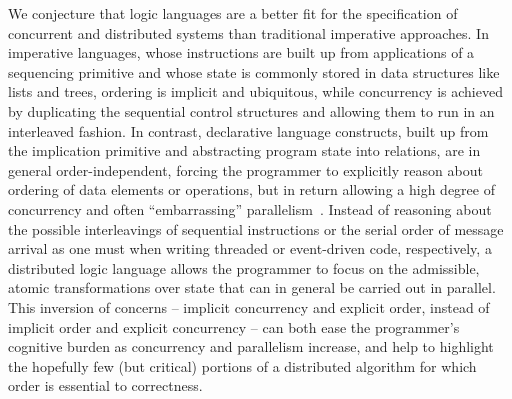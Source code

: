 \begin{comment}
Consider a distributed system in which participants announce their presence with 
\emph{heartbeat} messages; participants that want to reason about who is present must
remember the message content and the time of its arrival.  It is natural to represent the messages 
themselves as events, and the log of messages and timestamps as a persistent table:

\begin{Dedalus}
heartbeat\_cache(@Host, Peer, Time) \(\leftarrow\) 
  heartbeat(@Host, Peer), local\_time(Time);
\end{Dedalus}

 Although the Overlog language permits the transparent
intermixing of the table types, their interaction is often unintuitive, and compromises the
reading of rules as logical implications.  The state of the system after the arrival of some
number of \emph{heartbeat} events is clearly not a minimal model of the given input database,
which does not contain the events that (for one moment) caused the derivation of 
\emph{heartbeat\_cache} tuples.



\end{comment}

We conjecture that logic languages are a better fit for the specification of concurrent and distributed systems than traditional imperative approaches.  In imperative languages, whose instructions are built up from applications of a sequencing primitive and whose state is commonly stored in data structures like lists and trees, ordering is implicit and ubiquitous, 
while concurrency is achieved by duplicating the sequential control structures and allowing them
to run in an interleaved fashion.  In contrast, declarative language constructs, built up from the implication primitive and abstracting program state into relations, are in general order-independent, forcing the programmer to explicitly reason about ordering of data elements or operations, but in return allowing a high degree of concurrency and often ``embarrassing'' 
parallelism~\cite{podskey}.  Instead of reasoning about the possible interleavings of sequential
instructions or the serial order of message arrival as one must when writing threaded or 
event-driven code, respectively, a distributed logic language allows the programmer to focus
on the admissible, atomic transformations over state that can in general be carried out in
parallel.  This inversion of concerns -- implicit concurrency and explicit order, instead of
implicit order and explicit concurrency -- can both ease the programmer's cognitive burden as
concurrency and parallelism increase, and help to highlight the hopefully few (but critical) 
portions of a distributed algorithm for which order is essential to correctness. 

